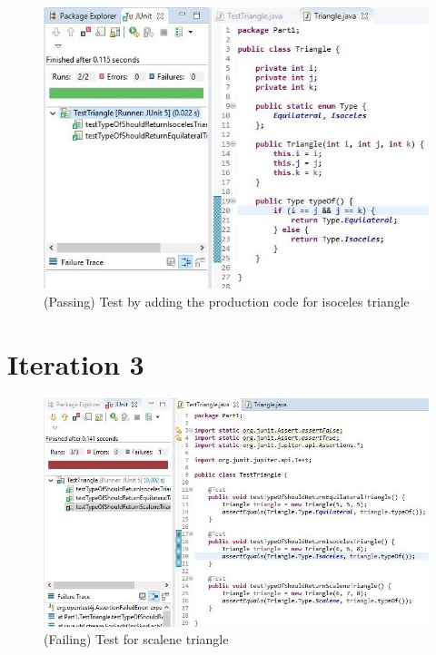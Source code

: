 \documentclass[9pt]{article}
\begin{document}
\begin{figure}[htb]
    \includegraphics[width=\linewidth]{./pics/p4.JPG}
    \caption{(Passing) Test by adding the production code for isoceles triangle}
\end{figure}

\clearpage{}

\section{Iteration 3}

\begin{figure}[htb]
    \includegraphics[width=\linewidth]{./pics/p5.JPG}
    \caption{(Failing) Test for scalene triangle}
\end{figure}
\end{document}
